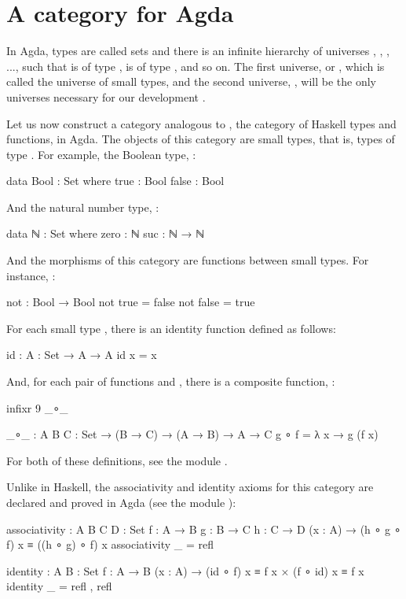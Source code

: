 \section{A category for Agda}
\label{sec:category-agda}

In Agda, types are called sets and there is an infinite hierarchy of
universes , , , ..., such
that  is of type ,  is of
type , and so on. The first universe, 
or , which is called the universe of small types, and
the second universe, , will be the only universes
necessary for our development \parencite[§ 2.1]{sicardramirez-2014}.

Let us now construct a category analogous to \hask, the category of
Haskell types and functions, in Agda. The objects of this category are
small types, that is, types of type . For example, the
Boolean type, :
\begin{codeagda}
data Bool : Set where
  true  : Bool
  false : Bool
\end{codeagda}
And the natural number type, :
\begin{codeagda}
data ℕ : Set where
  zero : ℕ
  suc  : ℕ → ℕ
\end{codeagda}
And the morphisms of this category are functions between small types.
For instance, :
\begin{codeagda}
not : Bool → Bool
not true  = false
not false = true
\end{codeagda}

For each small type , there is an identity function
defined as follows:
\begin{codeagda}
id : {A : Set} → A → A
id x = x
\end{codeagda}
And, for each pair of functions  and , there is a composite function, :
\begin{codeagda}
infixr 9 _∘_

_∘_ : {A B C : Set} → (B → C) → (A → B) → A → C
g ∘ f = λ x → g (f x)
\end{codeagda}
For both of these definitions, see the module .

Unlike in Haskell, the associativity and identity axioms for this
category are declared and proved in Agda (see the module
):
\begin{codeagda}
associativity : {A B C D : Set} {f : A → B} {g : B → C} {h : C → D}
                (x : A) → (h ∘ g ∘ f) x ≡ ((h ∘ g) ∘ f) x
associativity _ = refl

identity : {A B : Set} {f : A → B}
           (x : A) → (id ∘ f) x ≡ f x × (f ∘ id) x ≡ f x
identity _ = refl , refl
\end{codeagda}

